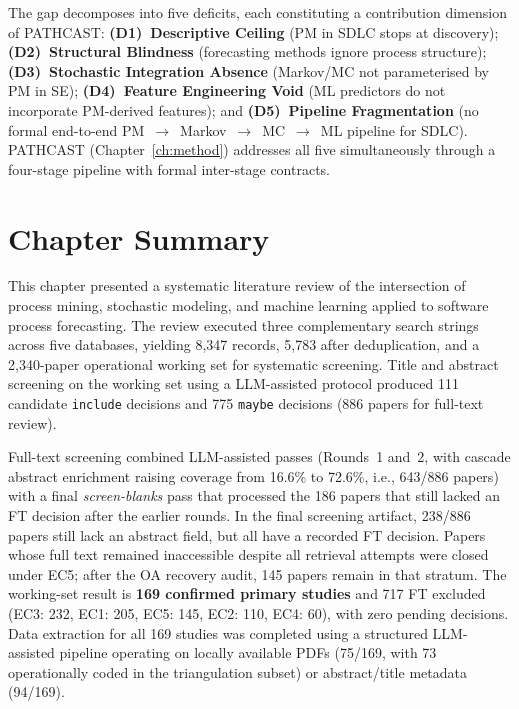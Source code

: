 The gap decomposes into five deficits, each constituting a contribution
dimension of PATHCAST: \textbf{(D1)~Descriptive Ceiling} (PM in SDLC
stops at discovery); \textbf{(D2)~Structural Blindness} (forecasting
methods ignore process structure); \textbf{(D3)~Stochastic Integration
Absence} (Markov/MC not parameterised by PM in SE); \textbf{(D4)~Feature
Engineering Void} (ML predictors do not incorporate PM-derived features);
and \textbf{(D5)~Pipeline Fragmentation} (no formal end-to-end
PM~$\to$~Markov~$\to$~MC~$\to$~ML pipeline for SDLC). PATHCAST
(Chapter~\ref{ch:method}) addresses all five simultaneously through a
four-stage pipeline with formal inter-stage contracts.


\section{Chapter Summary}
\label{sec:slr-summary}

This chapter presented a systematic literature review of the intersection of
process mining, stochastic modeling, and machine learning applied to software
process forecasting. The review executed three complementary search strings
across five databases, yielding 8{,}347 records, 5{,}783 after deduplication,
and a 2{,}340-paper operational working set for systematic screening. Title
and abstract screening on the working set using a LLM-assisted protocol
produced 111 candidate \texttt{include} decisions and 775 \texttt{maybe}
decisions (886 papers for full-text review).

Full-text screening combined LLM-assisted passes (Rounds~1 and~2, with cascade
abstract enrichment raising coverage from 16.6\% to 72.6\%, i.e., 643/886
papers) with a final \emph{screen-blanks} pass that processed the 186 papers
that still lacked an FT decision after the earlier rounds. In the final
screening artifact, 238/886 papers still lack an abstract field, but all have
a recorded FT decision. Papers whose full text remained inaccessible despite
all retrieval attempts were closed under EC5; after the OA recovery audit,
145 papers remain in that stratum. The working-set
result is \textbf{169 confirmed primary studies} and 717 FT excluded (EC3:
232, EC1: 205, EC5: 145, EC2: 110, EC4: 60), with zero pending decisions.
Data extraction for all 169 studies was completed using a structured
LLM-assisted pipeline operating on locally available PDFs (75/169, with 73
operationally coded in the triangulation subset) or abstract/title metadata
(94/169).

